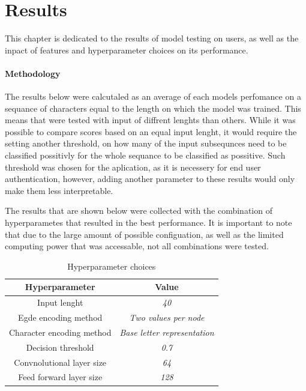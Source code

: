 
\chapter{Results}
This chapter is dedicated to the results of model testing on users, as well as the inpact of features and hyperparameter choices on its performance. 


\subsubsection{Methodology}
The results below were calcutaled as an average of each models perfomance on a sequance of characters equal to the length on which the model was trained.
This means that were tested with input of diffrent lenghts than others. 
While it was possible to compare scores based on an equal input lenght,
it would require the setting another threshold, on how many of the input subsequnces need to be classified possitivly for the whole sequance to be classified as possitive. 
Such threshold was chosen for the aplication, as it is necessery for end user authentication, however, adding another parameter to these results would only make them less interpretable.

The results that are shown below were collected with the combination of hyperparametes that resulted in the best performance. It is important to note that due to the large amount of possible
configuation, as well as the limited computing power that was accessable, not all combinations were tested.

\begin{center}
	\begin{table}[H]
		
\begin{center}
	\begin{tabular}{ |c|c|} 
		\hline
		Hyperparameter & Value \\
		\hline
		Input lenght & \textit{40} \\ 
		\hline
		Egde encoding method & \textit{Two values per node} \\		
		\hline 
		Character encoding method & \textit{Base letter representation} \\		 
		\hline
		Decision threshold & \textit{0.7} \\
		\hline
		Convnolutional layer size & \textit{64} \\
		\hline
		Feed forward layer size & \textit{128} \\
		\hline
	\end{tabular}
\end{center}
	\caption{Hyperparameter choices}
	\label{table:hyperparams}
	\end{table}
\end{center}

